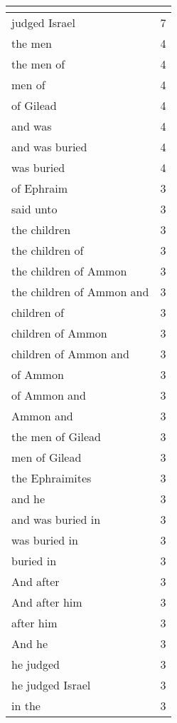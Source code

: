 \begin{center}
\begin{longtable}{|p{3.0in}|p{0.5in}|}
\hline \multicolumn{2}{c}{{ }} \\ \hline
\endfoot 
judged Israel & 7\\ \hline 
the men & 4\\ \hline 
the men of & 4\\ \hline 
men of & 4\\ \hline 
of Gilead & 4\\ \hline 
and was & 4\\ \hline 
and was buried & 4\\ \hline 
was buried & 4\\ \hline 
of Ephraim & 3\\ \hline 
said unto & 3\\ \hline 
the children & 3\\ \hline 
the children of & 3\\ \hline 
the children of Ammon & 3\\ \hline 
the children of Ammon and & 3\\ \hline 
children of & 3\\ \hline 
children of Ammon & 3\\ \hline 
children of Ammon and & 3\\ \hline 
of Ammon & 3\\ \hline 
of Ammon and & 3\\ \hline 
Ammon and & 3\\ \hline 
the men of Gilead & 3\\ \hline 
men of Gilead & 3\\ \hline 
the Ephraimites & 3\\ \hline 
and he & 3\\ \hline 
and was buried in & 3\\ \hline 
was buried in & 3\\ \hline 
buried in & 3\\ \hline 
And after & 3\\ \hline 
And after him & 3\\ \hline 
after him & 3\\ \hline 
And he & 3\\ \hline 
he judged & 3\\ \hline 
he judged Israel & 3\\ \hline 
in the & 3\\ \hline 
\end{longtable}
\end{center}





